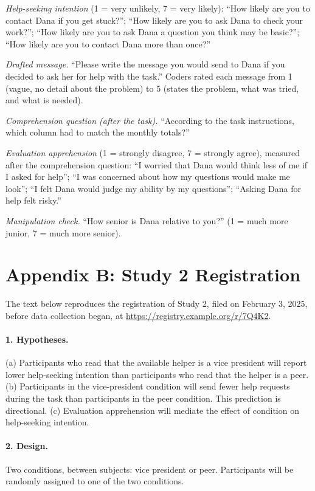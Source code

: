 \documentclass[11pt]{article}
\begin{document}
\textit{Help-seeking intention} (1 = very unlikely, 7 = very likely): ``How likely are you to contact Dana if you get stuck?''; ``How likely are you to ask Dana to check your work?''; ``How likely are you to ask Dana a question you think may be basic?''; ``How likely are you to contact Dana more than once?''

\textit{Drafted message.} ``Please write the message you would send to Dana if you decided to ask her for help with the task.'' Coders rated each message from 1 (vague, no detail about the problem) to 5 (states the problem, what was tried, and what is needed).

\textit{Comprehension question (after the task).} ``According to the task instructions, which column had to match the monthly totals?''

\textit{Evaluation apprehension} (1 = strongly disagree, 7 = strongly agree), measured after the comprehension question: ``I worried that Dana would think less of me if I asked for help''; ``I was concerned about how my questions would make me look''; ``I felt Dana would judge my ability by my questions''; ``Asking Dana for help felt risky.''

\textit{Manipulation check.} ``How senior is Dana relative to you?'' (1 = much more junior, 7 = much more senior).

\clearpage
\section*{Appendix B: Study 2 Registration}

The text below reproduces the registration of Study 2, filed on February 3, 2025, before data collection began, at \url{https://registry.example.org/r/7Q4K2}.

\paragraph{1. Hypotheses.} (a) Participants who read that the available helper is a vice president will report lower help-seeking intention than participants who read that the helper is a peer. (b) Participants in the vice-president condition will send fewer help requests during the task than participants in the peer condition. This prediction is directional. (c) Evaluation apprehension will mediate the effect of condition on help-seeking intention.

\paragraph{2. Design.} Two conditions, between subjects: vice president or peer. Participants will be randomly assigned to one of the two conditions.
\end{document}

